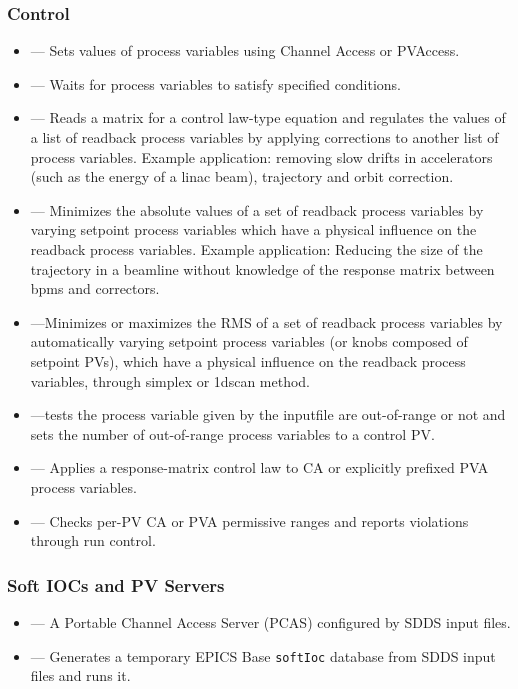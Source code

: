 \documentclass[11pt]{article}
\begin{document}
\subsubsection{Control}
\begin{itemize}
  \item {} --- Sets values of process variables using Channel Access or PVAccess.
  \item {} --- Waits for process variables to satisfy specified conditions.
  \item {} --- Reads a matrix for a control law-type equation and regulates the
values of a list of readback process variables by applying corrections to another list of process variables.
        Example application: removing slow drifts in accelerators (such as the energy of a linac beam), trajectory
        and orbit correction.
  \item {} --- Minimizes the absolute values of a set of readback process variables
        by varying setpoint process variables which have a physical influence on the readback process variables.
        Example application: Reducing the size of the trajectory in a beamline without knowledge of the
        response matrix between bpms and correctors.
  \item {} ---Minimizes or maximizes the RMS of a set of readback process variables by automatically varying setpoint process variables (or knobs composed of setpoint PVs), which have a physical influence on the readback process variables, through simplex or 1dscan method.
  \item {} ---tests the process variable given by the inputfile are out-of-range or not and sets the number of out-of-range process variables to a control PV.
  \item {} --- Applies a response-matrix control law
        to CA or explicitly prefixed PVA process variables.
  \item {} --- Checks per-PV CA or PVA permissive ranges
        and reports violations through run control.
\end{itemize}

\subsubsection{Soft IOCs and PV Servers}
\begin{itemize}
      \item {} --- A Portable Channel Access Server (PCAS) configured by SDDS input files.
      \item {} --- Generates a temporary EPICS Base \verb+softIoc+ database from SDDS input files and runs it.
\end{itemize}
\end{document}
